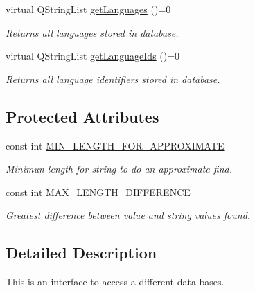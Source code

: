 \begin{DoxyCompactItemize}
$$virtual Q\+String\+List \mbox{\hyperlink{classDatabaseConnectorAbstract_a77ff263d407366e54f3e8512c575ff5e}{get\+Languages}} ()=0
\begin{DoxyCompactList}\small\item\em Returns all languages stored in database. \end{DoxyCompactList}\item 
virtual Q\+String\+List \mbox{\hyperlink{classDatabaseConnectorAbstract_a98f5b2472bab6edc82ce2c5554319d7f}{get\+Language\+Ids}} ()=0
\begin{DoxyCompactList}\small\item\em Returns all language identifiers stored in database. \end{DoxyCompactList}\end{DoxyCompactItemize}
\subsection*{Protected Attributes}
\begin{DoxyCompactItemize}
\item 
\mbox{\label{classDatabaseConnectorAbstract_a1ab06cd87949b36d40d4a26d0fc22ff3}} 
const int \mbox{\hyperlink{classDatabaseConnectorAbstract_a1ab06cd87949b36d40d4a26d0fc22ff3}{M\+I\+N\+\_\+\+L\+E\+N\+G\+T\+H\+\_\+\+F\+O\+R\+\_\+\+A\+P\+P\+R\+O\+X\+I\+M\+A\+TE}}
\begin{DoxyCompactList}\small\item\em Minimun length for string to do an approximate find. \end{DoxyCompactList}\item 
\mbox{\label{classDatabaseConnectorAbstract_acb4ab89c1daae4bd7a252677fb87f66e}} 
const int \mbox{\hyperlink{classDatabaseConnectorAbstract_acb4ab89c1daae4bd7a252677fb87f66e}{M\+A\+X\+\_\+\+L\+E\+N\+G\+T\+H\+\_\+\+D\+I\+F\+F\+E\+R\+E\+N\+CE}}
\begin{DoxyCompactList}\small\item\em Greatest difference between value and string values found. \end{DoxyCompactList}\end{DoxyCompactItemize}


\subsection{Detailed Description}
This is an interface to access a different data bases. 

